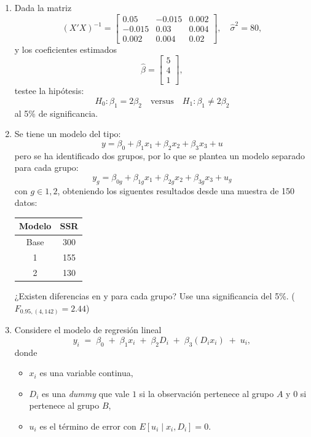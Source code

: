 \documentclass[10pt,a4paper]{article}
\begin{document}
\begin{enumerate}
        
\item Dada la matriz
        \[
          (X'X)^{-1} =
          \begin{bmatrix}
          0.05 & -0.015 & 0.002 \\
          -0.015 & 0.03 & 0.004 \\
          0.002 & 0.004 & 0.02
          \end{bmatrix},
          \quad \hat{\sigma}^2 = 80,
        \]
        y los coeficientes estimados
        \[
          \hat{\beta} = \begin{bmatrix} 5 \\ 4 \\ 1 \end{bmatrix},
        \]
        testee la hipótesis:
        \[
          H_0: \beta_1 = 2\beta_2
          \quad \text{versus} \quad
          H_1: \beta_1 \neq 2\beta_2
        \]
        al 5\% de significancia.

        

\item Se tiene un modelo del tipo:
$$y = \beta_0 + \beta_1x_1 + \beta_2x_2+\beta_3x_3 + u$$
pero se ha identificado dos grupos, por lo que se plantea un modelo separado para cada grupo:
$$y_g = \beta_{0g} + \beta_{1g}x_1 + \beta_{2g}x_2+\beta_{3g}x_3 + u_g$$
con $g\in {1,2}$, obteniendo los siguentes resultados desde una muestra de 150 datos:
\begin{center}
    \begin{tabular}{|c|c|}
    \hline
        Modelo & SSR \\
        \hline
        Base & 300 \\
        \hline
        1 & 155 \\
        \hline
        2 & 130 \\
        \hline
    \end{tabular}
\end{center}
¿Existen diferencias en y para cada grupo? Use una significancia del 5\%. ($F_{0.95,(4,142)}=2.44$)



\item Considere el modelo de regresión lineal
\[
y_i \;=\; \beta_0 \;+\; \beta_1 x_i \;+\; \beta_2 D_i \;+\; \beta_3 (D_i x_i) \;+\; u_i,
\]
donde
\begin{itemize}
  \item $x_i$ es una variable continua,
  \item $D_i$ es una \emph{dummy} que vale $1$ si la observación pertenece al grupo $A$ y $0$ si pertenece al grupo $B$,
  \item $u_i$ es el término de error con $E[u_i \mid x_i,D_i]=0$.
\end{itemize}


\end{enumerate}
\end{document}
